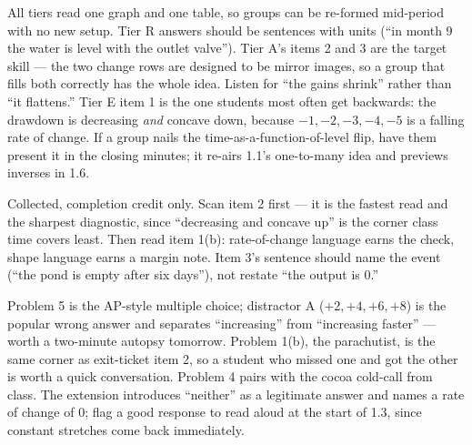 \documentclass[10pt]{article}
\begin{document}
\begin{teachernote}
All tiers read one graph and one table, so groups can be re-formed mid-period
with no new setup. Tier R answers should be sentences with units (``in month 9
the water is level with the outlet valve''). Tier A's items 2 and 3 are the
target skill --- the two change rows are designed to be mirror images, so a
group that fills both correctly has the whole idea. Listen for ``the gains
shrink'' rather than ``it flattens.'' Tier E item 1 is the one students most
often get backwards: the drawdown is decreasing \textit{and} concave down,
because $-1, -2, -3, -4, -5$ is a falling rate of change. If a group nails the
time-as-a-function-of-level flip, have them present it in the closing minutes;
it re-airs 1.1's one-to-many idea and previews inverses in 1.6.
\end{teachernote}

\begin{teachernote}
Collected, completion credit only. Scan item 2 first --- it is the fastest
read and the sharpest diagnostic, since ``decreasing and concave up'' is the
corner class time covers least. Then read item 1(b): rate-of-change language
earns the check, shape language earns a margin note. Item 3's sentence should
name the event (``the pond is empty after six days''), not restate ``the
output is 0.''
\end{teachernote}

\begin{teachernote}[Homework]
Problem 5 is the AP-style multiple choice; distractor A ($+2, +4, +6, +8$) is
the popular wrong answer and separates ``increasing'' from ``increasing
faster'' --- worth a two-minute autopsy tomorrow. Problem 1(b), the
parachutist, is the same corner as exit-ticket item 2, so a student who missed
one and got the other is worth a quick conversation. Problem 4 pairs with the
cocoa cold-call from class. The extension introduces ``neither'' as a
legitimate answer and names a rate of change of 0; flag a good response to
read aloud at the start of 1.3, since constant stretches come back
immediately.
\end{teachernote}
\end{document}

